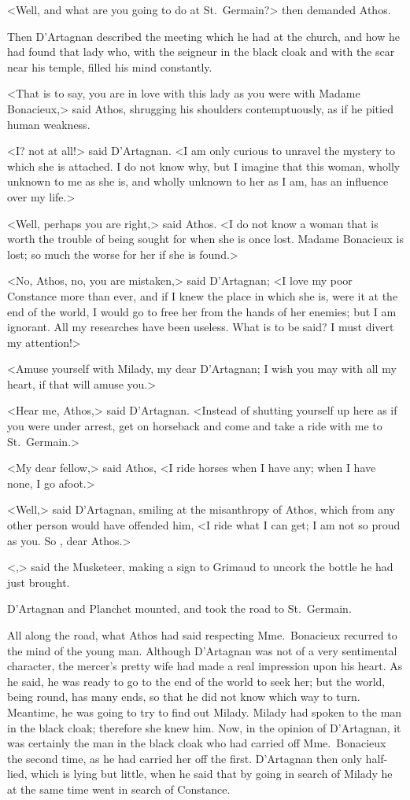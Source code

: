 <Well, and what are you going to do at St.~Germain?> then demanded Athos. 

Then D'Artagnan described the meeting which he had at the church, and how he had found that lady who, with the seigneur in the black cloak and with the scar near his temple, filled his mind constantly. 

<That is to say, you are in love with this lady as you were with Madame Bonacieux,> said Athos, shrugging his shoulders contemptuously, as if he pitied human weakness. 

<I? not at all!> said D'Artagnan. <I am only curious to unravel the mystery to which she is attached. I do not know why, but I imagine that this woman, wholly unknown to me as she is, and wholly unknown to her as I am, has an influence over my life.> 

<Well, perhaps you are right,> said Athos. <I do not know a woman that is worth the trouble of being sought for when she is once lost. Madame Bonacieux is lost; so much the worse for her if she is found.> 

<No, Athos, no, you are mistaken,> said D'Artagnan; <I love my poor Constance more than ever, and if I knew the place in which she is, were it at the end of the world, I would go to free her from the hands of her enemies; but I am ignorant. All my researches have been useless. What is to be said? I must divert my attention!> 

<Amuse yourself with Milady, my dear D'Artagnan; I wish you may with all my heart, if that will amuse you.> 

<Hear me, Athos,> said D'Artagnan. <Instead of shutting yourself up here as if you were under arrest, get on horseback and come and take a ride with me to St.~Germain.> 

<My dear fellow,> said Athos, <I ride horses when I have any; when I have none, I go afoot.> 

<Well,> said D'Artagnan, smiling at the misanthropy of Athos, which from any other person would have offended him, <I ride what I can get; I am not so proud as you. So , dear Athos.> 

<,> said the Musketeer, making a sign to Grimaud to uncork the bottle he had just brought. 

D'Artagnan and Planchet mounted, and took the road to St.~Germain. 

All along the road, what Athos had said respecting Mme.~Bonacieux recurred to the mind of the young man. Although D'Artagnan was not of a very sentimental character, the mercer's pretty wife had made a real impression upon his heart. As he said, he was ready to go to the end of the world to seek her; but the world, being round, has many ends, so that he did not know which way to turn. Meantime, he was going to try to find out Milady. Milady had spoken to the man in the black cloak; therefore she knew him. Now, in the opinion of D'Artagnan, it was certainly the man in the black cloak who had carried off Mme.~Bonacieux the second time, as he had carried her off the first. D'Artagnan then only half-lied, which is lying but little, when he said that by going in search of Milady he at the same time went in search of Constance. 

